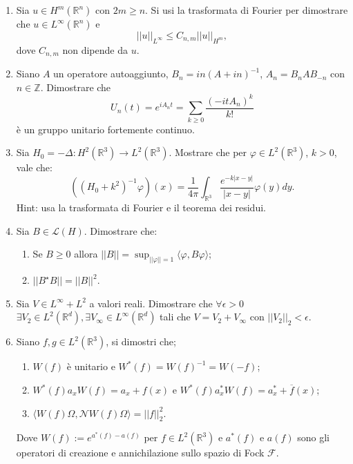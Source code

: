 \documentclass[]{book}
\theoremstyle{definition}
\newcommand{\F}{\mathcal{F}}
\begin{document}
\begin{enumerate}
\item Sia $u \in H^m(\mathbb{R}^n)$ con $2m \geq n$. Si usi la trasformata di Fourier per dimostrare che $u \in L^{\infty}(\mathbb{R}^n)$ e 
\[
||u||_{L^\infty} \leq C_{n, m}||u||_{H^m},
\]
dove $C_{n,m}$ non dipende da $u$.

\item Siano $A$ un operatore autoaggiunto, $B_n = in(A+in)^{-1}$, $A_n = B_n A B_{-n}$ con $n \in \mathbb{Z}$. Dimostrare che
\[
U_n(t) = e^{iA_n t} = \sum_{k \geq 0} \frac{(-itA_n)^k}{k!}
\]
è un gruppo unitario fortemente continuo.

\item Sia $H_0 = -\Delta:H^2(\mathbb{R}^3) \to L^2(\mathbb{R}^3)$. Mostrare che per $\varphi \in L^2(\mathbb{R}^3)$, $k > 0$, vale che:
\[
((H_0 + k^2)^{-1}\varphi)(x) = \frac{1}{4\pi}\int_{\mathbb{R}^3} \frac{e^{-k|x-y|}}{|x-y|}\varphi(y)dy.
\]Hint: usa la trasformata di Fourier e il teorema dei residui.

\item Sia $B \in \mathcal{L}(H)$. Dimostrare che:
\begin{enumerate}
    \item Se $B \geq 0$ allora $||B|| = \sup_{||\varphi|| = 1}\langle \varphi, B\varphi \rangle$;
    \item $||B^\star B|| = ||B||^2.$
\end{enumerate}

\item Sia \(V \in L^{\infty} + L^2\) a valori reali. Dimostrare che \(\forall \epsilon > 0\) \(\exists V_2 \in L^2(\mathbb{R}^d), \exists V_{\infty} \in L^{\infty}(\mathbb{R}^d)\) 
tali che \(V = V_2 + V_{\infty}\) con \(||V_2||_2 < \epsilon\).

\item Siano \(f, g \in L^2(\mathbb{R}^3)\), si dimostri che;
\begin{enumerate}
    \item \(W(f)\) è unitario e \(W^*(f) = W(f)^{-1} = W(-f)\);
    \item \(W^*(f)a_xW(f) = a_x + f(x)\) e \(W^*(f)a_x^*W(f)= a_x^* + \overline{f}(x)\);
    \item \(\langle W(f)\Omega, \mathcal{N}W(f)\Omega \rangle = ||f||_2^2\).
\end{enumerate}
Dove \(W(f) := e^{a^{*}(f)-a(f)}\) per \(f \in L^2(\mathbb{R}^3)\) e $a^{*}(f)$ e $a(f)$ sono gli operatori di creazione e annichilazione
sullo spazio di Fock $\F$. 



\end{enumerate}
\end{document}
